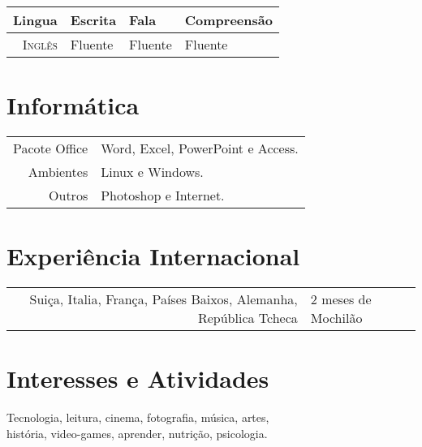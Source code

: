 \documentclass[a4paper,10pt]{article} %
\begin{document}
\begin{tabular}{r|lll}
Lingua & Escrita & Fala & Compreensão \\
\hline
\textsc{Inglês} & Fluente & Fluente & Fluente \\
\end{tabular}

 
\section{Informática}

\begin{tabular}{r|l}
Pacote Office & Word, Excel, PowerPoint e Access.\\
Ambientes & Linux e Windows.\\
Outros & Photoshop e Internet.\\
\end{tabular}

 
\section{Experiência Internacional}

\begin{tabular}{r|l}
Suiça, Italia, França, Países Baixos, Alemanha, República Tcheca & 2 meses de Mochilão\\
\end{tabular}


\section{Interesses e Atividades}

Tecnologia, leitura, cinema, fotografia, m\'{u}sica, artes,\\
hist\'{o}ria, video-games, aprender, nutriç\~{a}o, psicologia.
\end{document}
